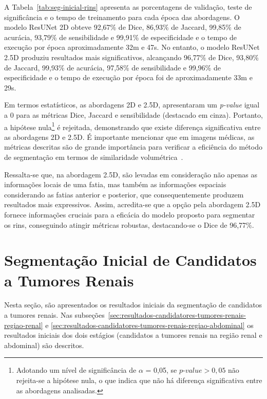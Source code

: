 A Tabela~\ref{tab:seg-inicial-rins} apresenta as porcentagens de validação, teste de significância e o tempo de treinamento para cada época das abordagens. O modelo ResUNet 2D obteve 92,67\% de Dice, 86,93\% de Jaccard, 99,85\% de acurácia, 93,79\% de sensibilidade e 99,91\% de especificidade e o tempo de execução por época aproximadamente 32m e 47s. No entanto, o modelo ResUNet 2.5D produziu resultados mais significativos, alcançando 96,77\% de Dice, 93,80\% de Jaccard, 99,93\% de acurácia, 97,58\% de sensibilidade e 99,96\% de especificidade e o tempo de execução por época foi de aproximadamente 33m e 29s.

Em termos estatísticos, as abordagens 2D e 2.5D, apresentaram um \textit{p-value} igual a 0 para as métricas Dice, Jaccard e sensibilidade (destacado em cinza). Portanto, a hipótese nula\footnote{Adotando um nível de significância de $\alpha$ = 0,05, se $\textit{p-value}>0,05$ não rejeita-se a hipótese nula, o que indica que não há diferença significativa entre as abordagens analisadas.} é rejeitada, demonstrando que existe diferença significativa entre as abordagens 2D e 2.5D. É importante mencionar que em imagens médicas, as métricas descritas são de grande importância para verificar a eficiência do método de segmentação em termos de similaridade volumétrica~\cite{taha2015metrics}.

Ressalta-se que, na abordagem 2.5D, são levadas em consideração não apenas as informações locais de uma fatia, mas também as informações espaciais considerando as fatias anterior e posterior, que consequentemente produzem resultados mais expressivos. Assim, acredita-se que a opção pela abordagem 2.5D fornece informações cruciais para a eficácia do modelo proposto para segmentar os rins, conseguindo atingir métricas robustas, destacando-se o Dice de 96,77\%. 


\section{Segmentação Inicial de Candidatos a Tumores Renais}
\label{sec:resultados-seg-inicial-candidatos-tumores-renais}

Nesta seção, são apresentados os resultados iniciais da segmentação de candidatos a tumores renais. Nas subseções~\ref{sec:resultados-candidatores-tumores-renais-regiao-renal} e \ref{sec:resultados-candidatores-tumores-renais-regiao-abdominal} os resultados iniciais dos dois estágios (candidatos a tumores renais na região renal e abdominal) são descritos.

